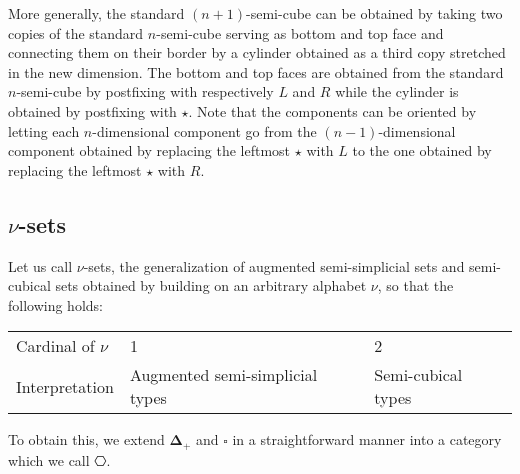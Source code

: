 \documentclass{msc}
\newcommand{\DeltaPlus}{\ensuremath{\boldsymbol{\Delta}_+}}
\newcommand{\Cube}{\ensuremath{\boldsymbol{{\square}}}}
\newcommand{\kstar}{{\star}}
\def\graymidrule{\arrayrulecolor{gray30}\midrule\arrayrulecolor{gray65}}
\begin{document}
More generally, the standard $(n + 1)$-semi-cube can be obtained by taking two copies of the standard $n$-semi-cube serving as bottom and top face and connecting them on their border by a cylinder obtained as a third copy stretched in the new dimension. The bottom and top faces are obtained from the standard $n$-semi-cube by postfixing with respectively $L$ and $R$ while the cylinder is obtained by postfixing with $\kstar$. Note that the components can be oriented by letting each $n$-dimensional component go from the $(n-1)$-dimensional component obtained by replacing the leftmost $\kstar$ with $L$ to the one obtained by replacing the leftmost $\kstar$ with $R$.

\subsection*{\texorpdfstring{$\nu$}{ν}-sets}
Let us call $\nu$-sets, the generalization of augmented semi-simplicial sets and semi-cubical sets obtained by building on an arbitrary alphabet $\nu$, so that the following holds:

\begin{center}
  \begin{tabularx}{0.7\linewidth}{X|X|X}
    \toprule
    Cardinal of $\nu$ & 1                               & 2                  \\
    \graymidrule
    Interpretation    & Augmented semi-simplicial types & Semi-cubical types \\
    \bottomrule
  \end{tabularx}
\end{center}

To obtain this, we extend $\DeltaPlus$ and $\Cube$ in a straightforward manner into a category which we call $\hexagon$.
\end{document}

